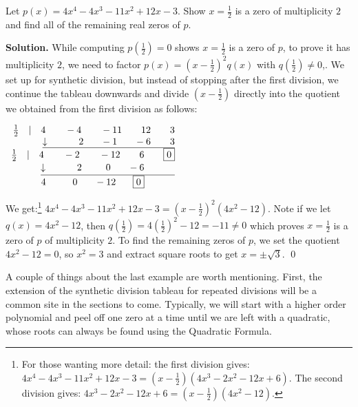 \documentclass{ximera}
\begin{document}
\begin{example}  Let $p(x) = 4x^4-4x^3-11x^2+12x-3$. Show $x=\frac{1}{2}$ is a zero of multiplicity $2$ and find all of the remaining real zeros of $p$.


{\bf Solution.}  While computing $p\left(\frac{1}{2} \right) = 0$ shows $x=\frac{1}{2}$  is a zero of $p$, to prove it has multiplicity $2$, we need to factor $p(x) = \left(x - \frac{1}{2}\right)^2 q(x)$ with $q\left( \frac{1}{2} \right) \neq 0$,.   We set up for synthetic division, but instead of stopping after the first division, we continue the tableau downwards and divide $\left(x - \frac{1}{2}\right)$ directly into the quotient we obtained from the first division as follows:

\begin{center}
$
\begin{array}{r}
 \frac{1}{2} \quad |\quad 4 \quad\quad -4 \quad\quad -11 \quad\quad 12 \quad\quad 3\\
 \underline{\downarrow \phantom{11}\quad\quad  2 \quad\phantom{1.} -1\quad\phantom{1.} -6 \quad\quad 3}\\
 \frac{1}{2} \quad |\quad 4 \quad\quad -2 \quad\quad -12 \quad\quad 6 \quad\quad \fbox{0}\\
 \underline{\downarrow \phantom{11}\quad\quad  2 \quad\phantom{111} 0\quad\phantom{1.} -6 \phantom{\quad\quad \fbox{0}}}\\
4 \phantom{1.}\quad\quad 0 \phantom{1.}\quad -12 \phantom{1.}\quad \fbox{0} \phantom{\quad\quad \fbox{0}}
\end{array}
$    
\end{center}

We get:\footnote{For those wanting more detail:  the first division gives:  $4x^4-4x^3-11x^2+12x-3=\left(x-\frac{1}{2}\right) \left(4x^3-2x^2-12x+6\right)$.  The second division gives: $4x^3-2x^2-12x+6=\left(x-\frac{1}{2}\right)\left(4x^2-12\right)$.}   $4x^4-4x^3-11x^2+12x-3 = \left(x-\frac{1}{2}\right)^2\left(4x^2-12\right)$.  Note if we let $q(x) = 4x^2-12$, then $q\left(\frac{1}{2} \right) = 4\left(\frac{1}{2} \right)^2 - 12 = -11 \neq 0$  which proves $x = \frac{1}{2}$ is a zero of $p$ of multiplicity $2$.   To find the remaining zeros of $p$, we set the quotient $4x^2-12=0$, so $x^2 = 3$ and extract square roots to get $x = \pm \sqrt{3}$.  \qed

\end{example}

A couple of things about the last example are worth mentioning. First, the extension of the synthetic division tableau for repeated divisions will be a common site in the sections to come. Typically, we will start with a higher order polynomial and peel off one zero at a time until we are left with a quadratic, whose roots can always be found using the Quadratic Formula.  
\end{document}
